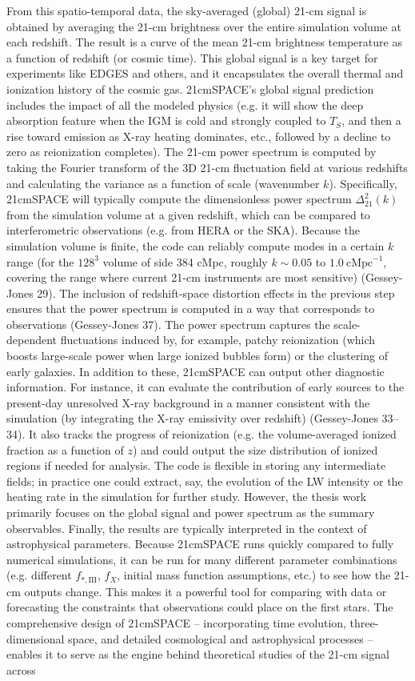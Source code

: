 \documentclass[floats,floatfix,showpacs,amssymb,prd,superscriptaddress,nofootinbib]{revtex4-2} %
\begin{document}
From this spatio-temporal data, the sky-averaged (global) 21-cm signal is obtained by averaging the 21-cm brightness over the entire simulation volume at each redshift. The result is a curve of the mean 21-cm brightness temperature as a function of redshift (or cosmic time). This global signal is a key target for experiments like EDGES and others, and it encapsulates the overall thermal and ionization history of the cosmic gas. 21cmSPACE’s global signal prediction includes the impact of all the modeled physics (e.g. it will show the deep absorption feature when the IGM is cold and strongly coupled to $T_S$, and then a rise toward emission as X-ray heating dominates, etc., followed by a decline to zero as reionization completes). The 21-cm power spectrum is computed by taking the Fourier transform of the 3D 21-cm fluctuation field at various redshifts and calculating the variance as a function of scale (wavenumber $k$). Specifically, 21cmSPACE will typically compute the dimensionless power spectrum $\Delta^2_{21}(k)$ from the simulation volume at a given redshift, which can be compared to interferometric observations (e.g. from HERA or the SKA). Because the simulation volume is finite, the code can reliably compute modes in a certain $k$ range (for the $128^3$ volume of side 384 cMpc, roughly $k \sim 0.05$ to $1.0~\text{cMpc}^{-1}$, covering the range where current 21-cm instruments are most sensitive) (Gessey-Jones 29). The inclusion of redshift-space distortion effects in the previous step ensures that the power spectrum is computed in a way that corresponds to observations (Gessey-Jones 37). The power spectrum captures the scale-dependent fluctuations induced by, for example, patchy reionization (which boosts large-scale power when large ionized bubbles form) or the clustering of early galaxies. In addition to these, 21cmSPACE can output other diagnostic information. For instance, it can evaluate the contribution of early sources to the present-day unresolved X-ray background in a manner consistent with the simulation (by integrating the X-ray emissivity over redshift) (Gessey-Jones 33–34). It also tracks the progress of reionization (e.g. the volume-averaged ionized fraction as a function of $z$) and could output the size distribution of ionized regions if needed for analysis. The code is flexible in storing any intermediate fields; in practice one could extract, say, the evolution of the LW intensity or the heating rate in the simulation for further study. However, the thesis work primarily focuses on the global signal and power spectrum as the summary observables. Finally, the results are typically interpreted in the context of astrophysical parameters. Because 21cmSPACE runs quickly compared to fully numerical simulations, it can be run for many different parameter combinations (e.g. different $f_{*,\text{III}}$, $f_X$, initial mass function assumptions, etc.) to see how the 21-cm outputs change. This makes it a powerful tool for comparing with data or forecasting the constraints that observations could place on the first stars. The comprehensive design of 21cmSPACE – incorporating time evolution, three-dimensional space, and detailed cosmological and astrophysical processes – enables it to serve as the engine behind theoretical studies of the 21-cm signal across 
\end{document}
